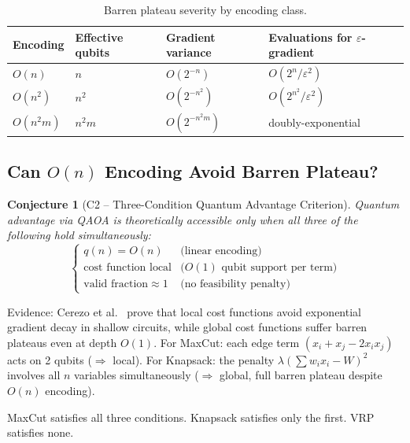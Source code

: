 \documentclass[11pt]{article}
\newtheorem{conjecture}[theorem]{Conjecture}
\theoremstyle{remark}
\begin{document}
\begin{table}[ht]
\centering
\caption{Barren plateau severity by encoding class.}
\label{tab:barren}
\begin{tabular}{@{}llll@{}}
\toprule
Encoding & Effective qubits & Gradient variance
  & Evaluations for $\varepsilon$-gradient \\
\midrule
$O(n)$     & $n$     & $O(2^{-n})$     & $O(2^n/\varepsilon^2)$ \\
$O(n^2)$   & $n^2$   & $O(2^{-n^2})$   & $O(2^{n^2}/\varepsilon^2)$ \\
$O(n^2 m)$ & $n^2 m$ & $O(2^{-n^2 m})$ & doubly-exponential \\
\bottomrule
\end{tabular}
\end{table}

\subsection{Can $O(n)$ Encoding Avoid Barren Plateau?}

\begin{conjecture}[C2 -- Three-Condition Quantum Advantage Criterion]
\label{conj:C2}
Quantum advantage via QAOA is theoretically accessible only when all three
of the following hold simultaneously:
\begin{equation}
  \begin{cases}
    q(n) = O(n) & \text{(linear encoding)} \\
    \text{cost function local} & \text{($O(1)$ qubit support per term)} \\
    \text{valid fraction} \approx 1 & \text{(no feasibility penalty)}
  \end{cases}
\end{equation}
\end{conjecture}

\noindent Evidence: Cerezo et al.~\cite{cerezo2021cost} prove that local cost
functions avoid exponential gradient decay in shallow circuits, while global
cost functions suffer barren plateaus even at depth $O(1)$.
For MaxCut: each edge term $(x_i + x_j - 2x_i x_j)$ acts on 2 qubits
($\Rightarrow$ local). For Knapsack: the penalty $\lambda(\sum w_i x_i - W)^2$
involves all $n$ variables simultaneously ($\Rightarrow$ global, full barren
plateau despite $O(n)$ encoding).

\noindent MaxCut satisfies all three conditions. Knapsack satisfies only the
first. VRP satisfies none.

\end{document}
